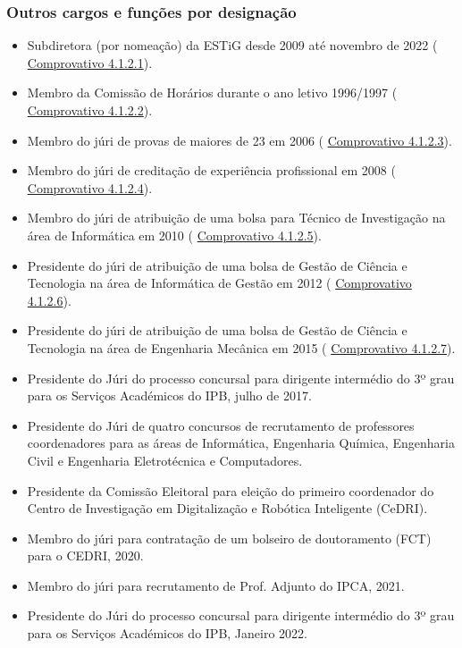 \documentclass[11pt]{article}
\begin{document}
\subsubsection{Outros cargos e funções por designação}
\begin{itemize}
\item{Subdiretora (por nomeação) da ESTiG desde 2009 até novembro de 2022 (
\href{run:MissaoIPBCargos/subdiretora.pdf}{Comprovativo 4.1.2.1}).}
\item{Membro da Comissão de Horários durante o ano letivo 1996/1997 (
\href{run:MissaoIPBoutros/comissaoHorarios.pdf}{Comprovativo 4.1.2.2}).}
\item{Membro do júri de provas de maiores de 23 em 2006 (
\href{run:JuriProvas/Maiores23.pdf}{Comprovativo 4.1.2.3}).}
\item{Membro do júri de creditação de experiência profissional em 2008 (
\href{run:JuriProvas/JuriExpProf.pdf}{Comprovativo 4.1.2.4}).}
\item{Membro do júri de atribuição de uma bolsa para Técnico de Investigação na área de Informática em 2010 (
\href{run:JuriProvas/BolsaCIMO.pdf}{Comprovativo 4.1.2.5}).}
\item{Presidente do júri de atribuição de uma bolsa de Gestão de Ciência e Tecnologia na área de Informática de Gestão em 2012 (
\href{run:JuriProvas/BolsaIG.pdf}{Comprovativo 4.1.2.6}).}
\item{Presidente do júri de atribuição de uma bolsa de Gestão de Ciência e Tecnologia na área de Engenharia Mecânica em 2015 (
\href{run:JuriProvas/BolsaFabLab.pdf}{Comprovativo 4.1.2.7}).}
\item{Presidente do Júri do processo concursal para dirigente intermédio do 3º grau para os Serviços Académicos do IPB, julho de 2017.}
\item{Presidente do Júri de quatro concursos de recrutamento de professores coordenadores para as áreas de Informática, Engenharia Química, Engenharia Civil e Engenharia Eletrotécnica e Computadores.}
\item{Presidente da Comissão Eleitoral para eleição do primeiro coordenador do Centro de Investigação em Digitalização e Robótica Inteligente (CeDRI).}
\item{Membro do júri para contratação de um bolseiro de doutoramento (FCT) para o CEDRI, 2020.}
\item{Membro do júri para recrutamento de Prof. Adjunto do IPCA, 2021.}
\item{Presidente do Júri do processo concursal para dirigente intermédio do 3º grau para os Serviços Académicos do IPB, Janeiro 2022.}

\end{itemize}
\end{document}
